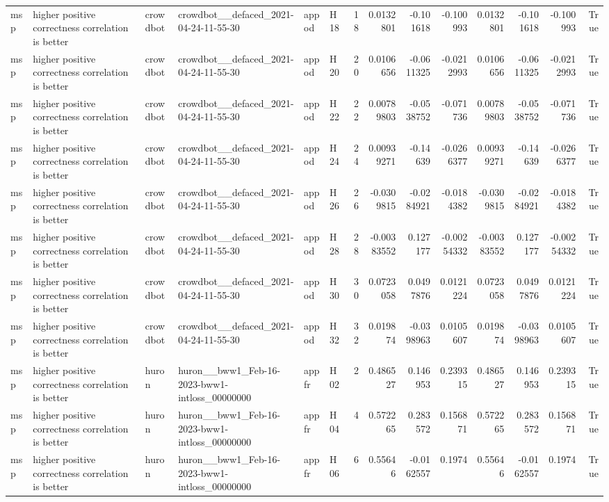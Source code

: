 \begin{longtable}{llllllrrrrrrrr}
msp & higher positive correctness correlation is better & crowdbot & crowdbot\_\_defaced\_2021-04-24-11-55-30 & appod & H18 & 18 & 0.0132801 & -0.101618 & -0.100993 & 0.0132801 & -0.101618 & -0.100993 & True \\
msp & higher positive correctness correlation is better & crowdbot & crowdbot\_\_defaced\_2021-04-24-11-55-30 & appod & H20 & 20 & 0.0106656 & -0.0611325 & -0.0212993 & 0.0106656 & -0.0611325 & -0.0212993 & True \\
msp & higher positive correctness correlation is better & crowdbot & crowdbot\_\_defaced\_2021-04-24-11-55-30 & appod & H22 & 22 & 0.00789803 & -0.0538752 & -0.071736 & 0.00789803 & -0.0538752 & -0.071736 & True \\
msp & higher positive correctness correlation is better & crowdbot & crowdbot\_\_defaced\_2021-04-24-11-55-30 & appod & H24 & 24 & 0.00939271 & -0.14639 & -0.0266377 & 0.00939271 & -0.14639 & -0.0266377 & True \\
msp & higher positive correctness correlation is better & crowdbot & crowdbot\_\_defaced\_2021-04-24-11-55-30 & appod & H26 & 26 & -0.0309815 & -0.0284921 & -0.0184382 & -0.0309815 & -0.0284921 & -0.0184382 & True \\
msp & higher positive correctness correlation is better & crowdbot & crowdbot\_\_defaced\_2021-04-24-11-55-30 & appod & H28 & 28 & -0.00383552 & 0.127177 & -0.00254332 & -0.00383552 & 0.127177 & -0.00254332 & True \\
msp & higher positive correctness correlation is better & crowdbot & crowdbot\_\_defaced\_2021-04-24-11-55-30 & appod & H30 & 30 & 0.0723058 & 0.0497876 & 0.0121224 & 0.0723058 & 0.0497876 & 0.0121224 & True \\
msp & higher positive correctness correlation is better & crowdbot & crowdbot\_\_defaced\_2021-04-24-11-55-30 & appod & H32 & 32 & 0.019874 & -0.0398963 & 0.0105607 & 0.019874 & -0.0398963 & 0.0105607 & True \\
msp & higher positive correctness correlation is better & huron & huron\_\_bww1\_Feb-16-2023-bww1-intloss\_00000000 & appfr & H02 & 2 & 0.486527 & 0.146953 & 0.239315 & 0.486527 & 0.146953 & 0.239315 & True \\
msp & higher positive correctness correlation is better & huron & huron\_\_bww1\_Feb-16-2023-bww1-intloss\_00000000 & appfr & H04 & 4 & 0.572265 & 0.283572 & 0.156871 & 0.572265 & 0.283572 & 0.156871 & True \\
msp & higher positive correctness correlation is better & huron & huron\_\_bww1\_Feb-16-2023-bww1-intloss\_00000000 & appfr & H06 & 6 & 0.55646 & -0.0162557 & 0.1974 & 0.55646 & -0.0162557 & 0.1974 & True \\

\end{longtable}
